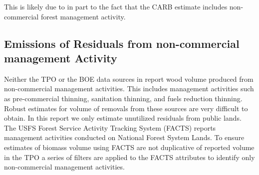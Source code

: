 \documentclass[a4paper,titlepage]{article}
\begin{document}
This is likely due to in part to the fact that the \ac{CARB} estimate includes non-commercial forest management activity.

\subsection{Emissions of Residuals from non-commercial management Activity}
\label{sec:orgheadline19}

Neither the \ac{TPO} or the \ac{BOE} data sources in report wood volume produced from non-commercial management activities. This includes management
activities such as pre-commercial thinning, sanitation thinning, and
fuels reduction thinning. Robust estimates for volume of removals from these sources are very difficult to obtain. In this report we only estimate unutilized residuals from public lands. The USFS Forest Service Activity Tracking System (FACTS) reports management activities conducted on National Forest System Lands. To ensure estimates of biomass volume using FACTS are not duplicative of reported volume in the TPO a series of filters are applied to the FACTS attributes to identify only non-commercial management activities.
\end{document}
